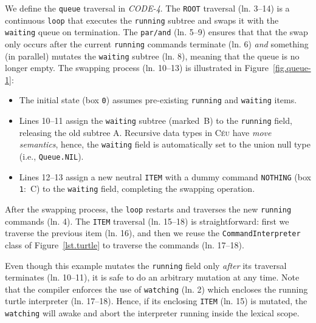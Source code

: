 \documentclass{sig-alternate}
\newcommand{\CEU}{\textsc{C\'{e}u}\xspace}
\newcommand{\code}[1] {{\small{\texttt{#1}}}}
\newcommand{\MM}[1] {\textcircled{\tiny{\textsf{#1}}}}
\begin{document}
We define the \code{queue} traversal in \emph{CODE-4}.
%
The \code{ROOT} traversal (ln. 3--14) is a continuous \code{loop} that 
executes the \code{running} subtree and swaps it with the \code{waiting} queue 
on termination.
The \code{par/and} (ln. 5--9) ensures that that the swap only occurs after 
the current \code{running} commands terminate (ln. 6) \emph{and} something (in 
parallel) mutates the \code{waiting} subtree (ln. 8), meaning that the queue 
is no longer empty.
The swapping process (ln. 10--13) is illustrated in Figure~\ref{fig.queue-1}: 
%
\begin{itemize}
%
\item The initial state (box \code{0}) assumes pre-existing \code{running} and 
\code{waiting} items.
%
\item Lines 10--11 assign the \code{waiting} subtree (marked~\MM{B}) to the 
\code{running} field, releasing the old subtree \MM{A}.
Recursive data types in \CEU have \emph{move semantics}, hence, the 
\code{waiting} field is automatically set to the union null type (i.e., 
\code{Queue.NIL}).
%
\item Lines 12--13 assign a new neutral \code{ITEM} with a dummy command 
\code{NOTHING} (box \code{1}:~\MM{C}) to the \code{waiting} field, completing 
the swapping operation.
%
\end{itemize}
%
After the swapping process, the \code{loop} restarts and traverses the new 
\code{running} commands (ln. 4).
%
The \code{ITEM} traversal (ln. 15--18) is straightforward:
first we traverse the previous item (ln. 16), and then we reuse the 
\code{CommandInterpreter} class of Figure~\ref{lst.turtle} to traverse the 
commands (ln. 17--18).

Even though this example mutates the \code{running} field only \emph{after} its 
traversal terminates (ln. 10--11), it is safe to do an arbitrary mutation at 
any time.
Note that the compiler enforces the use of \code{watching} (ln. 
2) which encloses the running turtle interpreter (ln. 17--18).
Hence, if its enclosing \code{ITEM} (ln. 15) is mutated, the \code{watching} 
will awake and abort the interpreter running inside the lexical scope.
\end{document}
